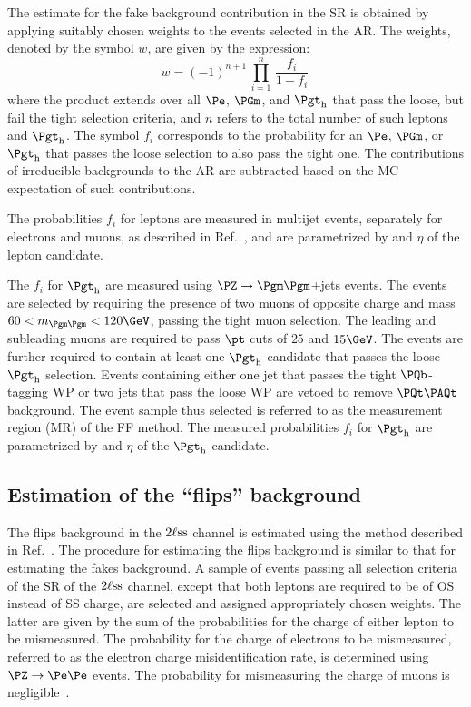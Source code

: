 The estimate for the fake background contribution in the SR is obtained by applying suitably chosen weights to the events selected in the AR.
The weights, denoted by the symbol $w$, are given by the expression:
\begin{equation}
w = (-1)^{n+1} \, \prod_{i=1}^{n} \, \frac{f_{i}}{1 - f_{i}}\,
\label{eq:FF_weights}
\end{equation}
where the product extends over all $\Pe$, $\PGm$, and $\tauh$
that pass the loose, but fail the tight selection criteria,
and $n$ refers to the total number of such leptons and $\tauh$.
The symbol $f_{i}$ corresponds to the probability for an $\Pe$, $\PGm$, or $\tauh$ that passes the loose selection to also pass the tight one.
The contributions of irreducible backgrounds to the AR are subtracted based on the MC expectation of such contributions.

The probabilities $f_{i}$ for leptons are measured in multijet events, separately for electrons and muons, as described in Ref.~\cite{Sirunyan:2020icl},
and are parametrized by \pt and $\eta$ of the lepton candidate.

The $f_{i}$ for $\tauh$ are measured using $\Zmm$+jets events.
The events are selected by requiring the presence of two muons of opposite charge and mass $60 < m_{\Pgm\Pgm} < 120\GeV$,
passing the tight muon selection.
The leading and subleading muons are required to pass $\pt$ cuts of $25$ and $15\GeV$.
The events are further required to contain at least one $\tauh$ candidate that passes the loose $\tauh$ selection.
Events containing either one jet that passes the tight $\Pbottom$-tagging WP or two jets that pass the loose WP are vetoed to remove $\ttbar$ background.
The event sample thus selected is referred to as the measurement region (MR) of the FF method.
The measured probabilities $f_{i}$ for $\tauh$ are parametrized by \pt and $\eta$ of the $\tauh$ candidate.


\subsection{Estimation of the ``flips'' background}
\label{sec:backgroundEstimation_flips}

The flips background in the $2\ell\text{ss}$ channel is estimated using the method described in Ref.~\cite{Sirunyan:2020icl}.
The procedure for estimating the flips background is similar to that for estimating the fakes background.
A sample of events passing all selection criteria of the SR of the $2\ell\text{ss}$ channel, 
except that both leptons are required to be of OS instead of SS charge, 
are selected and assigned appropriately chosen weights.
The latter are given by the sum of the probabilities for the charge of either lepton to be mismeasured.
The probability for the charge of electrons to be mismeasured, referred to as the electron charge misidentification rate,
is determined using $\Zee$ events.
The probability for mismeasuring the charge of muons is negligible~\cite{Sirunyan:2020icl}.
